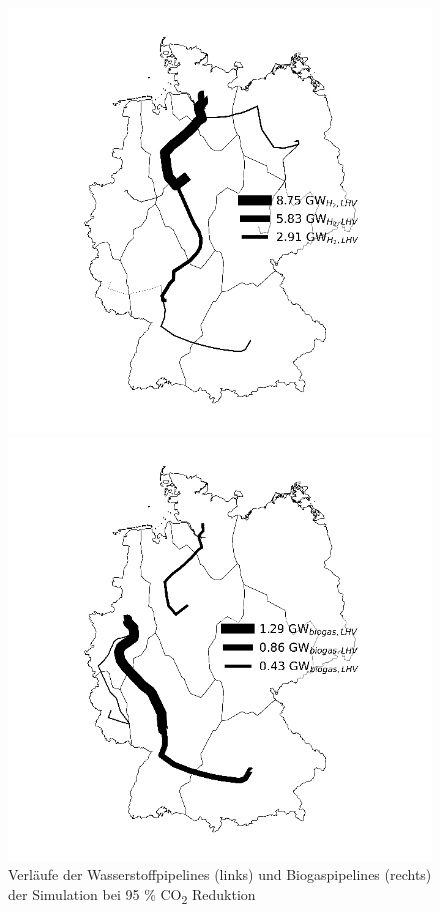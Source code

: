 \begin{figure}[!ht]
  \begin{minipage}[b]{.4\linewidth} 
     \includegraphics{images/H2Pipeline-95.png}
  \end{minipage}
  \hspace{.1\linewidth}
  \begin{minipage}[b]{.4\linewidth} 
     \includegraphics{images/BiogasPipeline-95.png}
  \end{minipage}
  \caption{Verläufe der Wasserstoffpipelines (links) und Biogaspipelines (rechts) der Simulation bei 95 \% CO\textsubscript{2} Reduktion}
  \label{image:Pipelines-95}
\end{figure}

